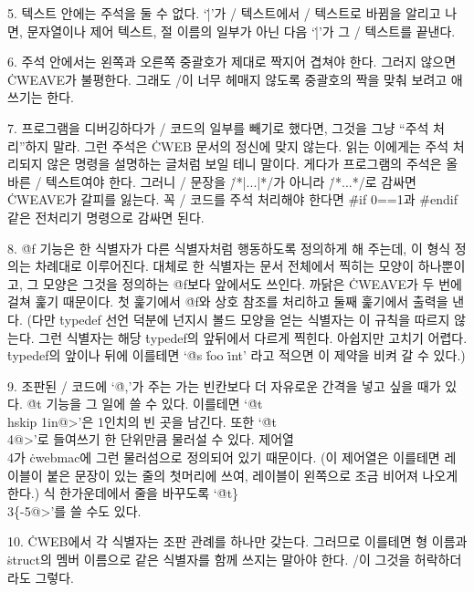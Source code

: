 5. \pb 텍스트 안에는 주석을 둘 수 없다. `\.|'가 \TEX/ 텍스트에서 \CEE/ 텍스트로
바뀜을 알리고 나면, 문자열이나 제어 텍스트, 절 이름의 일부가 아닌 다음 `\.|'가
그 \CEE/ 텍스트를 끝낸다.

6. 주석 안에서는 왼쪽과 오른쪽 중괄호가 제대로 짝지어 겹쳐야 한다. 그러지 않으면
\.{CWEAVE}가 불평한다. 그래도 \TEX/이 너무 헤매지 않도록 중괄호의 짝을 맞춰 보려고
애쓰기는 한다.

7. 프로그램을 디버깅하다가 \CEE/ 코드의 일부를 빼기로 했다면, 그것을 그냥 ``주석
처리''하지 말라. 그런 주석은 \.{CWEB} 문서의 정신에 맞지 않는다. 읽는 이에게는
주석 처리되지 않은 명령을 설명하는 글처럼 보일 테니 말이다. 게다가 프로그램의
주석은 올바른 \TEX/ 텍스트여야 한다. 그러니 \CEE/ 문장을 \.{/*|...|*/}가 아니라
\.{/*...*/}로 감싸면 \.{CWEAVE}가 갈피를 잃는다. 꼭 \CEE/ 코드를 주석 처리해야
한다면 \.{\#if 0==1}과 \.{\#endif} 같은 전처리기 명령으로 감싸면 된다.

8. \.{@f} 기능은 한 식별자가 다른 식별자처럼 행동하도록 정의하게 해 주는데, 이
형식 정의는 차례대로 이루어진다. 대체로 한 식별자는 문서 전체에서 찍히는 모양이
하나뿐이고, 그 모양은 그것을 정의하는 \.{@f}보다 앞에서도 쓰인다. 까닭은 \.{CWEAVE}가
두 번에 걸쳐 훑기 때문이다. 첫 훑기에서 \.{@f}와 상호 참조를 처리하고 둘째 훑기에서
출력을 낸다. (다만 \.{typedef} 선언 덕분에 넌지시 볼드 모양을 얻는 식별자는 이
규칙을 따르지 않는다. 그런 식별자는 해당 \.{typedef}의 앞뒤에서 다르게 찍힌다.
아쉽지만 고치기 어렵다. \.{typedef}의 앞이나 뒤에 이를테면 `\.{@s} \.{foo} \.{int}'
라고 적으면 이 제약을 비켜 갈 수 있다.)

9. 조판된 \CEE/ 코드에 `\.{@,}'가 주는 가는 빈칸보다 더 자유로운 간격을 넣고
싶을 때가 있다. \.{@t} 기능을 그 일에 쓸 수 있다. 이를테면 `\.{@t\\hskip 1in@>}'은
1인치의 빈 곳을 남긴다. 또한 `\.{@t\\4@>}'로 들여쓰기 한 단위만큼 물러설 수 있다.
제어열 \.{\\4}가 \.{cwebmac}에 그런 물러섬으로 정의되어 있기 때문이다. (이 제어열은
이를테면 레이블이 붙은 문장이 있는 줄의 첫머리에 쓰여, 레이블이 왼쪽으로 조금
비어져 나오게 한다.) 식 한가운데에서 줄을 바꾸도록 `\.{@t\}\\3\{-5@>}'를 쓸 수도
있다.

10. \.{CWEB}에서 각 식별자는 조판 관례를 하나만 갖는다. 그러므로 이를테면 형 이름과
\.{struct}의 멤버 이름으로 같은 식별자를 함께 쓰지는 말아야 한다. \CEE/이 그것을
허락하더라도 그렇다.

